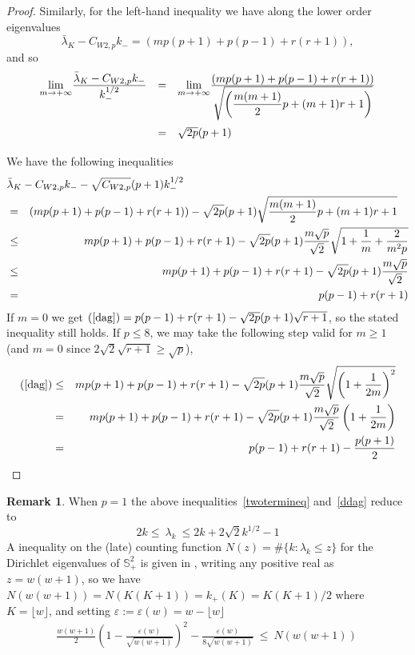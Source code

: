 \documentclass[11pt,a4paper,times]{amsart}
\theoremstyle{plain}
\theoremstyle{definition}
\newtheorem{remark}{Remark}[section]
\numberwithin{equation}{section}
\newcommand{\ds}{\displaystyle}
\newcommand{\eqskip}{ \vspace*{2mm}\\ }
\newcommand{\Cwnp}[2]{ C_{W #1,#2}}
\newcommand{\fr}[2]{\frac{\ds #1}{\ds #2}}
\begin{document}
{\begin{proof}
Similarly, for the left-hand inequality we have along the lower order eigenvalues
\[\bar{\lambda}_K-C_{W 2,p}k_-=\left(mp(p+1)+p(p-1)+r(r+1)\right),\]
 and so
\[
\begin{array}{lll}
{\ds \lim_{m\to +\infty}} \fr{\bar{\lambda}_K-C_{W 2,p}k_-}{k_-^{1/2}} & = &
{\ds \lim_{m\to +\infty}}\fr{\left(mp(p+1)+p(p-1)+r(r+1)\right)}{\sqrt{\left(\frac{m(m+1)}{2}p+ (m+1)r+1\right)}}\eqskip
& = & \sqrt{2p}(p+1)\eqskip
\end{array}
\]
We have the following inequalities
\begin{eqnarray}%
\lefteqn{\bar{\lambda}_K-C_{W 2,p}k_- -\sqrt{\Cwnp{2}{p}}(p+1)k_-^{1/2}}\nonumber\\
&=&\left(mp(p+1)+p(p-1)+r(r+1)\right) 
-\sqrt{2p}(p+1)\sqrt{\frac{m(m+1)}{2}p+(m+1)r+1}\quad \label{dag}\eqskip
&\leq& mp(p+1)+p(p-1)+r(r+1)
-\sqrt{2p}(p+1)\frac{m\sqrt{p}}{\sqrt{2}}\sqrt{1+\frac{1}{m}+ \frac{2}{m^2p}}\nonumber\eqskip
&\leq&  mp(p+1)+p(p-1)+r(r+1)
-\sqrt{2p}(p+1)\frac{m\sqrt{p}}{\sqrt{2}}\nonumber\eqskip
&=& p(p-1)+r(r+1)\nonumber 
\end{eqnarray}
If $m=0$ we get  
$(\ref{dag})=p(p-1)+r(r+1)-\sqrt{2p}(p+1)\sqrt{r+1}$, so the stated inequality still holds.
If $p\leq 8$, we may take the following step valid for $m\geq 1$ (and $m=0$ since $2\sqrt{2}\sqrt{r+1}\geq \sqrt{p}$),
\begin{eqnarray*}
(\ref{dag})&\leq & mp(p+1)+p(p-1)+r(r+1)
-\sqrt{2p}(p+1)\frac{m\sqrt{p}}{\sqrt{2}}\sqrt{\left(1+\frac{1}{2m}\right)^2}\eqskip
&=& mp(p+1)+p(p-1)+r(r+1)
-\sqrt{2p}(p+1)\frac{m\sqrt{p}}{\sqrt{2}}\left(1+\frac{1}{2m}\right)\eqskip
&=& p(p-1)+r(r+1)-\frac{p(p+1)}{2}
\end{eqnarray*}
\end{proof}
%
\begin{remark} When $p=1$ the above inequalities~\eqref{twotermineq} and~\eqref{ddag} reduce to
\begin{equation}
 \label{*}2 k \leq ~ \lambda_k~\leq 2 k+2\sqrt{2}k^{1/2}-1
\end{equation}
A inequality on the (late) counting function $N(z)=\#\{k: \lambda_k\leq z\}$ for  the Dirichlet eigenvalues of $\mathbb{ S}^2_+$ is given in \cite[Theorem 3.2.1]{blps}, writing any positive real as $z=w(w+1)$, so we have $N(w(w+1))=N(K(K+1))=k_+(K)=K(K+1)/2$ where $K=\lfloor w \rfloor$, and setting  $\varepsilon:=\varepsilon(w)=w-\lfloor w \rfloor$
\begin{gather}
\frac{w(w+1)}{2}\left(1-\frac{\varepsilon(w)}{\sqrt{w(w+1)}}\right)^2-\frac{\varepsilon(w)}{8\sqrt{w(w+1)}}~\leq ~N(w(w+1))~

\end{gather}
\end{remark}}
\end{document}
